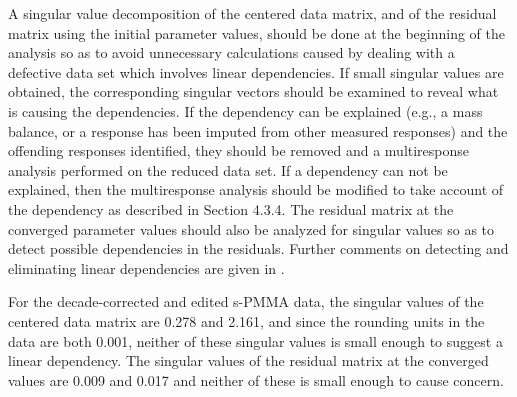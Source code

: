 A singular value decomposition of the centered data matrix, and
of the residual matrix using the initial parameter values,
should be done at the beginning of the analysis so as to avoid
unnecessary calculations caused by dealing with a defective
data set which involves linear dependencies.
If small singular values are obtained, the corresponding singular
vectors should be examined to reveal what is causing the
dependencies.
If the dependency can be explained (e.g., a mass balance, or a response
has been imputed from other measured responses) and the offending
responses identified, they should be removed and a multiresponse
analysis performed on the reduced data set.
If a dependency can not be explained, then the multiresponse analysis
should be modified to take account of the dependency as described
in Section 4.3.4.
The residual matrix at the converged parameter values
should also be analyzed for singular values
so as to detect possible dependencies in the residuals.
Further comments on detecting and eliminating linear
dependencies are given in
.

\begin{example}\label{spmma:4}
For the decade-corrected and edited s-PMMA data, the singular
values of the centered data matrix
are 0.278 and 2.161, and since
the rounding units in the data are both 0.001,
neither of these singular values is small
enough to suggest a linear dependency.
The singular values of the residual matrix at the converged values
are 0.009 and 0.017 and neither of these is small enough to cause
concern.
\end{example}

